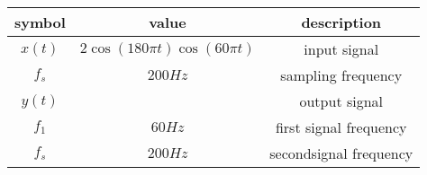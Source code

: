 
\begin{tabular}{|c|c|c|}
	\hline
	\textbf{symbol} & \textbf{value} & \textbf{description} \\
	\hline
	$x(t)$ & $2\cos{(180\pi t)}\cos{(60\pi t)}$ & input signal \\
	\hline
	$f_s$ & $200Hz$ & sampling frequency \\
	\hline
	$y(t)$ &  & output signal \\
	\hline
	$f_1$ & $60Hz$ & first signal frequency \\
	\hline
	$f_s$ & $200Hz$ & secondsignal frequency \\
	\hline
\end{tabular}
